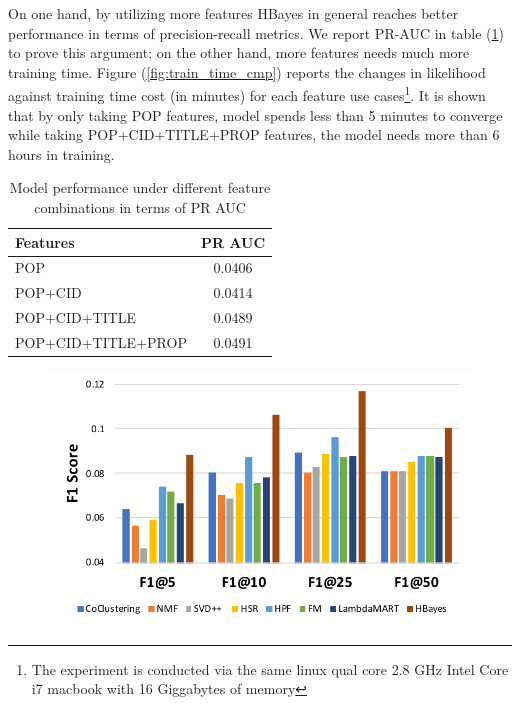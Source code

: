 On one hand, by utilizing more features HBayes in general reaches better performance in terms of precision-recall metrics.  We report PR-AUC in table (\ref{tab:features_cmp}) to prove this argument; on the other hand, more features needs much more training time.  Figure (\ref{fig:train_time_cmp}) reports the changes in likelihood against training time cost (in minutes) for each feature use cases\footnote{The experiment is conducted via the same linux qual core 2.8 GHz Intel Core i7 macbook with 16 Giggabytes of memory}.   It is shown that by only taking POP features, model spends less than 5 minutes to converge while taking POP+CID+TITLE+PROP features, the model needs more than 6 hours in training.   

\begin{table}[htb]
\centering
\begin{tabular}{l|c}
\toprule
\textbf{Features} & \textbf{PR AUC} \\
\hline
POP & 0.0406 \\
\rowcolor{mygray}
POP+CID & 0.0414 \\
POP+CID+TITLE & 0.0489 \\
\rowcolor{mygray}
POP+CID+TITLE+PROP & 0.0491 \\
\bottomrule
\end{tabular}
\caption{Model performance under different feature combinations in terms of PR AUC}
\label{tab:features_cmp}
\end{table}

\begin{figure}[!htb]
\includegraphics[width=0.7\linewidth]{fig/legend}
\end{figure}

